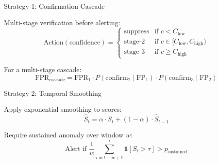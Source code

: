 \documentclass[
  ignorenonframetext,
]{beamer}
\begin{document}
\begin{frame}[allowframebreaks]{Strategy 1: Confirmation Cascade}
\protect{}\label{strategy-1-confirmation-cascade}
\begin{definition}
\label{def:confirmation-cascade}
Multi-stage verification before alerting:
\begin{equation}
\label{eq:cascade-decision}
\text{Action}(\text{confidence}) = \begin{cases}
\text{suppress} & \text{if } c < C_{\text{low}} \\
\text{stage-2} & \text{if } c \in [C_{\text{low}}, C_{\text{high}}) \\
\text{stage-3} & \text{if } c \geq C_{\text{high}}
\end{cases}
\end{equation}
\end{definition}

\begin{theorem}
\label{thm:cascade-fpr}
For a multi-stage cascade:
\begin{equation}
\label{eq:cascade-fpr}
\text{FPR}_{\text{cascade}} = \text{FPR}_1 \cdot P(\text{confirm}_2 \mid \text{FP}_1) \cdot P(\text{confirm}_3 \mid \text{FP}_2)
\end{equation}
\end{theorem}
\end{frame}

\begin{frame}[allowframebreaks]{Strategy 2: Temporal Smoothing}
\protect{}\label{strategy-2-temporal-smoothing}
\begin{definition}
\label{def:smoothed-detection}
Apply exponential smoothing to scores:
\begin{equation}
\label{eq:smoothed-score}
\hat{S}_t = \alpha \cdot S_t + (1 - \alpha) \cdot \hat{S}_{t-1}
\end{equation}
\end{definition}

\begin{definition}
\label{def:burst-suppression}
Require sustained anomaly over window $w$:
\begin{equation}
\label{eq:burst-suppression}
\text{Alert if } \frac{1}{w} \sum_{i=t-w+1}^{t} \mathbb{1}[S_i > \tau] > p_{\text{sustained}}
\end{equation}
\end{definition}
\end{frame}
\end{document}
